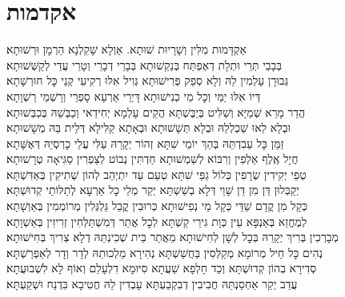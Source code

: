 \documentclass[twoside, openany, parskip=half, 11pt]{book}
\begin{document}
\section[אקדמות]{ אקדמות }

\begin{footnotesize}

\shatz
אַקְדָּמוּת מִלִּין וְשָׁרָיוּת שׁוּתָא. אַוְלָא שָׁקֵלְנָא הַרְמָן וּרְשׁוּתָא׃\\
\kahal
בְּבָבֵי תְּרֵי וּתְלָת דְאֶפְתַּח בְּנַקְשׁוּתָא בְּבָרֵי דְבָרֵי וְטָרֵי עֲדֵי לְקַשְּׁשׁוּתָא׃\\
\shatz
גְּבוּרָן עָלְמִין לֵהּ וְלָא סְפֵק פְּרִישׁוּתָא גְּוִיל אִלּוּ רְקִיעֵי קְנֵי כׇּל חוּרְשָׁתָא׃\\
\kahal
דְּיוֹ אִלּוּ יַמֵּי וְכׇל מֵי כְנִישׁוּתָא דָּיְרֵי אַרְעָא סָפְרֵי וְרָשְׁמֵי רַשְׁוָתָא׃\\
\shatz
הֲדַר מָרֵא שְׁמַיָּא וְשַׁלִּיט בְּיַבֶּשְׁתָּא הֲקֵים עָלְמָא יְחִידַאי וְכַבְּשֵׁהּ בְּכַבְּשׁוּתָא׃\\
\kahal
וּבְלָא לֵאוּ שַׁכְלְלֵהּ וּבְלָא תְּשָׁשׁוּתָא וּבְאָתָא קַלִּילָא דְּלֵית בַּהּ מְשָׁשׁוּתָא׃\\
\shatz
זַמֵּן כׇּל עַבִדְתֵּהּ בְּהַךְ יוֹמֵי שִׁתָּא זְהוֹר יְקָרֵהּ עַלִּי עֲלֵי כׇרְסְיֵהּ דְּאֶשָּׁתָא׃\\
\kahal
חֲיָל אֶֽלֶף אַלְפִין וְרִבּוֹא לְשַׁמְשׁוּתָא חַדְתִּין נְבוֹט לְצַפְרִין סַגִּיאָה טְרָשׁוּתָא׃\\
\shatz
טְפֵי יְקִידִין שְׂרָפִין כְּלוֹל גַפֵּי שִׁתָּא טְעֵם עַד יִתְיְהֵב לְהוֹן שְׁתִיקִין בְּאַדִּשְׁתָּא׃\\
\kahal
יְקַבְּלוּן דֵּן מִן דֵּן שָׁוֵי דְּלָא בְשַׁשְׁתָּא יְקַר מְלֵי כׇל אַרְעָא לְתַלּוֹתֵי קְדוּשְׁתָּא׃\\
\shatz
כְּקָל מִן קֳדָם שַׁדַּי כְּקָל מֵי נְפִישׁוּתָא כְּרוּבִין קֳבֵל גַּלְגְּלִין מְרוֹמְמִין בְּאַוְשָׁתָא׃\\
\kahal
לְמֶחֱזֵא בְּאַנְפָּא עֵין כְּוָת גִּירֵי קַשְׁתָּא לְכׇל אֲתַר דְּמִשְׁתַּלְּחִין זְרִיזִין בְּאַשְׁוָתָא׃\\
\shatz
מְבָרְכִין בְּרִיךְ יְקָרֵהּ בְּכׇל לְשָׁן לְחִישׁוּתָא מֵאֲתַר בֵּית שְׁכִינְתֵּהּ דְלָא צְרִיךְ בְּחִישׁוּתָא׃\\
\kahal
נְהִים כׇּל חֵיל מְרוֹמָא מְקַלְּסִין בַּחֲשַׁשְׁתָּא נְהִירָא מַלְכוּתֵהּ לְדָר וְדָר לְאַפְרַשְׁתָּא׃\\
\shatz
סְדִירָא בְהוֹן קְדוּשְׁתָּא וְכַד חָלְפָא שַׁעֲתָא סִיּוּמָא דִלְעָלַם וְאוֹף לָא לִשְׁבוּעֲתָא׃\\
\kahal
עֲדַב יְקַר אַחְסַנְתֵּהּ חֲבִיבִין דְבִקְבַעְתָּא עָבְדִין לֵהּ חֲטִיבָא בִּדְנַח וּשְׁקַעְתָּא׃\\

\end{footnotesize}
\end{document}
